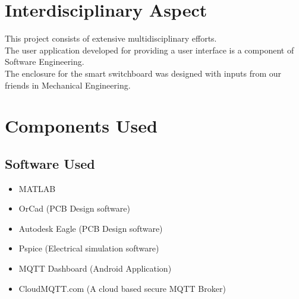         \section{Interdisciplinary Aspect}
        	This project consists of extensive multidisciplinary efforts.\\
        	The user application developed for providing a user interface is a component of Software Engineering.\\
        	The enclosure for the smart switchboard was designed with inputs from our friends in Mechanical Engineering.\\
        	
        \section{Components Used}
	        \subsection{Software Used}
	        \begin{itemize}
	        	\item MATLAB
	        	\item OrCad (PCB Design software)
	        	\item Autodesk Eagle (PCB Design software)
	        	\item Pspice (Electrical simulation software)
	        	\item MQTT Dashboard (Android Application)
	        	\item CloudMQTT.com (A cloud based secure MQTT Broker)
	        \end{itemize}
	        
